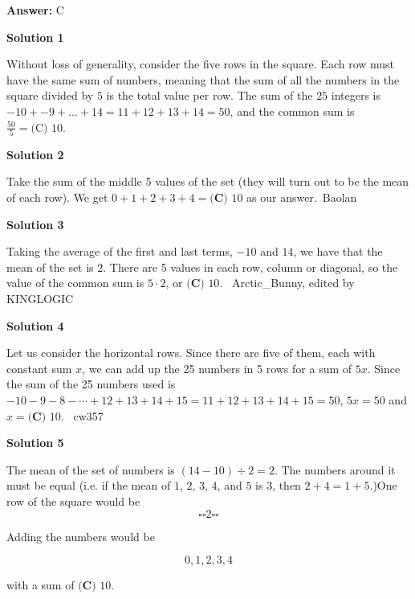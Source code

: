 \begin{enumerate}
 \textbf{Answer: }C



\textbf{Solution 1}

Without loss of generality, consider the five rows in the square. Each row must have the same sum of numbers, meaning that the sum of all the numbers in the square divided by $5$ is the total value per row. The sum of the $25$ integers is $-10+-9+...+14=11+12+13+14=50$, and the common sum is $\frac{50}{5}=\boxed{\text{(C) }10}$.

 



\textbf{Solution 2}

Take the sum of the middle 5 values of the set (they will turn out to be the mean of each row). We get $0 + 1 + 2 + 3 + 4 = \boxed{\textbf{(C) } 10}$ as our answer.~Baolan

 



\textbf{Solution 3}

Taking the average of the first and last terms, $-10$ and $14$, we have that the mean of the set is $2$. There are 5 values in each row, column or diagonal, so the value of the common sum is $5\cdot2$, or $\boxed{\textbf{(C) } 10}$. ~Arctic\_Bunny, edited by KINGLOGIC

 



\textbf{Solution 4}

Let us consider the horizontal rows.  Since there are five of them, each with constant sum $x$, we can add up the 25 numbers in 5 rows for a sum of $5x$.  Since the sum of the 25 numbers used is $-10-9-8-\cdots{}+12+13+14+15=11+12+13+14+15=50$, $5x=50$ and $x=\boxed{\textbf{(C) }10}$. ~cw357

 



\textbf{Solution 5}

The mean of the set of numbers is $(14-10) \div 2 = 2$. The numbers around it must be equal (i.e. if the mean of $1$, $2$, $3$, $4$, and $5$ is $3$, then $2+4=1+5$.)One row of the square would be 
 \[\square  \square  2  \square  \square\]

 Adding the numbers would be 

 
 \[0, 1, 2, 3, 4\]

 with a sum of $\boxed {\textbf {(C) }10}$.

 


 




\end{enumerate}
